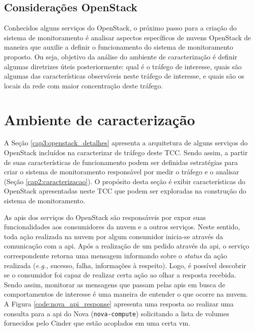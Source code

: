 \subsection{Considerações OpenStack}
Conhecidos alguns serviços do OpenStack, o próximo passo para a criação do sistema de monitoramento é analisar aspectos específicos de nuvens OpenStack de maneira que auxilie a definir o funcionamento do sistema de monitoramento proposto.
%
Ou seja, objetivo da análise do ambiente de caracterização é definir algumas diretrizes úteis posteriormente: qual é o tráfego de interesse, quais são algumas das características observáveis neste tráfego de interesse, e quais são os locais da rede com maior concentração deste tráfego.

\section{Ambiente de caracterização}
\label{cap3:ambiente}

A Seção \ref{cap3:openstack_detalhes} apresenta a arquitetura de alguns serviços do OpenStack incluídos na caracterizar de tráfego deste TCC.
%
Sendo assim, a partir de suas características de funcionamento podem ser definidas estratégias para criar o sistema de monitoramento responsável por medir o tráfego e o analisar (Seção \ref{cap2:caracterizacao}).
%
O propósito desta seção é exibir características do OpenStack apresentadas neste TCC que podem ser exploradas na construção do sistema de monitoramento.

As \acp{api} dos serviços do OpenStack são responsáveis por expor suas funcionalidades aos consumidores da nuvem e a outros serviços.
%
Neste sentido, toda ação realizada na nuvem por algum consumidor inicia-se através da comunicação com a \ac{api}.
%
Após a realização de um pedido através da \ac{api}, o serviço correspondente retorna uma mensagem informando sobre o \textit{status} da ação realizada (\textit{e.g.,} sucesso, falha, informações à respeito).
%
Logo, é possível descobrir se o consumidor foi capaz de realizar certa ação ao olhar a resposta recebida.
%
Sendo assim, monitorar as mensagens que passam pelas \acp{api} em busca de comportamentos de interesse é uma maneira de entender o que ocorre na nuvem.
%
A Figura \ref{code:nova_api_response} apresenta uma resposta ao realizar uma consulta para a \ac{api} do Nova (\texttt{nova-compute}) solicitando a lista de volumes fornecidos pelo Cinder que estão acoplados em uma certa \ac{vm}.

